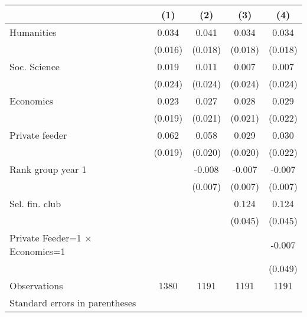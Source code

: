 \begin{tabular}{l*{4}{c}}
\toprule
                    &\multicolumn{1}{c}{(1)}&\multicolumn{1}{c}{(2)}&\multicolumn{1}{c}{(3)}&\multicolumn{1}{c}{(4)}\\
\midrule
Humanities          &       0.034&       0.041&       0.034&       0.034\\
                    &     (0.016)&     (0.018)&     (0.018)&     (0.018)\\
\addlinespace
Soc. Science        &       0.019&       0.011&       0.007&       0.007\\
                    &     (0.024)&     (0.024)&     (0.024)&     (0.024)\\
\addlinespace
Economics           &       0.023&       0.027&       0.028&       0.029\\
                    &     (0.019)&     (0.021)&     (0.021)&     (0.022)\\
\addlinespace
Private feeder      &       0.062&       0.058&       0.029&       0.030\\
                    &     (0.019)&     (0.020)&     (0.020)&     (0.022)\\
\addlinespace
Rank group year 1   &            &      -0.008&      -0.007&      -0.007\\
                    &            &     (0.007)&     (0.007)&     (0.007)\\
\addlinespace
Sel. fin. club      &            &            &       0.124&       0.124\\
                    &            &            &     (0.045)&     (0.045)\\
\addlinespace
Private Feeder=1 $\times$ Economics=1&            &            &            &      -0.007\\
                    &            &            &            &     (0.049)\\
\midrule
Observations        &        1380&        1191&        1191&        1191\\
\bottomrule
\multicolumn{5}{l}{\footnotesize Standard errors in parentheses}\\
\end{tabular}
